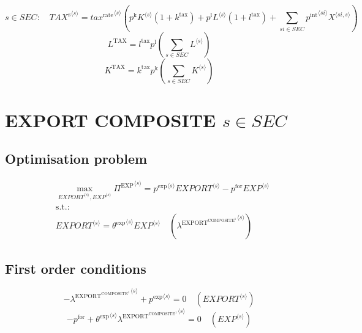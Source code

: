 \begin{equation}
s\in {S\!E\!C}\colon\quad {{T\!A\!X}^{\mathrm{s}}}^{\langle s\rangle} = {{{t\!a\!x}^{\mathrm{rate}}}^{\langle s\rangle}} \left({p^{\mathrm{k}}} {{K}^{\langle s\rangle}} \left(1 + k^{\mathrm{tax}}\right) + {p^{\mathrm{l}}} {{L}^{\langle s\rangle}} \left(1 + l^{\mathrm{tax}}\right) + \sum_{{s\!i}\in {S\!E\!C}} {{p^{\mathrm{int}}}^{\langle {s\!i}\rangle}} {{X}^{\langle {s\!i},s\rangle}}\right)
\end{equation}
\begin{equation}
L^{\mathrm{TAX}} = {l^{\mathrm{tax}}} {p^{\mathrm{l}}} \left(\sum_{s\in {S\!E\!C}} {L}^{\langle s\rangle}\right)
\end{equation}
\begin{equation}
K^{\mathrm{TAX}} = {k^{\mathrm{tax}}} {p^{\mathrm{k}}} \left(\sum_{s\in {S\!E\!C}} {K}^{\langle s\rangle}\right)
\end{equation}




\section{EXPORT COMPOSITE $s\in {S\!E\!C}$}

\subsection{Optimisation problem}

\begin{align}
&\max_{{{E\!X\!P\!O\!R\!T}}^{\langle s\rangle}, {{E\!X\!P}}^{\langle s\rangle}
} {\Pi^{\mathrm{EXP}}}^{\langle s\rangle} = {{p^{\mathrm{exp}}}^{\langle s\rangle}} {{{E\!X\!P\!O\!R\!T}}^{\langle s\rangle}} - {p^{\mathrm{for}}} {{{E\!X\!P}}^{\langle s\rangle}}\\
&\mathrm{s.t.:}\nonumber\\
& {{E\!X\!P\!O\!R\!T}}^{\langle s\rangle} = {{\theta^{\mathrm{exp}}}^{\langle s\rangle}} {{{E\!X\!P}}^{\langle s\rangle}} \quad \left({\lambda^{\mathrm{EXPORT}^{\mathrm{COMPOSITE}^{\mathrm{1}}}}}^{\langle s\rangle}\right)
\end{align}


\subsection{First order conditions}

\begin{equation}
-{\lambda^{\mathrm{EXPORT}^{\mathrm{COMPOSITE}^{\mathrm{1}}}}}^{\langle s\rangle} + {p^{\mathrm{exp}}}^{\langle s\rangle} = 0
 \quad \left({{E\!X\!P\!O\!R\!T}}^{\langle s\rangle}\right)
\end{equation}
\begin{equation}
-p^{\mathrm{for}} + {{\theta^{\mathrm{exp}}}^{\langle s\rangle}} {{\lambda^{\mathrm{EXPORT}^{\mathrm{COMPOSITE}^{\mathrm{1}}}}}^{\langle s\rangle}} = 0
 \quad \left({{E\!X\!P}}^{\langle s\rangle}\right)
\end{equation}


